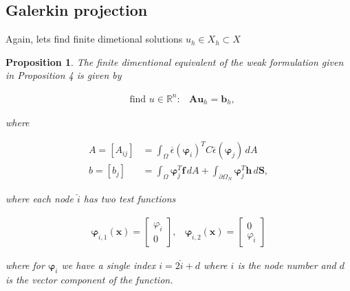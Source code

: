 \documentclass[11pt,a4paper,english]{elsarticle}%
\newtheorem{proposition}[theorem]{Proposition}
\begin{document}
\subsection{Galerkin projection}
Again, lets find finite dimetional solutions $u_h \in X_h \subset X$
\begin{proposition}
    The finite dimentional equivalent of the weak formulation given in Proposition 4 is given by


        \begin{align}
        &\text{find } u \in \mathbb{R}^n : 
        &\bm A \bm u_h = \bm b_h,
        \end{align}


    where 


        \begin{align}
        A = [A_{ij}] &= \int_\Omega \overline\epsilon (\bm \varphi_i)^T C \overline \epsilon (\bm \varphi_j) \, dA \\
        b = [b_j] &= \int_\Omega \bm \varphi_j^T \bm f \, dA + \int_{\partial \Omega_N} \bm \varphi_j^T \bm h \, d\bm S,
        \end{align}


    where each node $\hat i$ has two test functions
    
 
        \begin{align}
        \bm \varphi_{\hat i,1} (\bm x) = 
         \begin{bmatrix}
            \varphi_{\hat i}  \\
            0 
        \end{bmatrix},
        &
        \bm \varphi_{\hat i,2} (\bm x) = 
        \begin{bmatrix}
            0  \\
            \varphi_{\hat i} 
        \end{bmatrix} 
    \end{align}

    where for $\bm \varphi_i$ we have a single index $i = 2\hat i + d$ where $i$ is the node number and $d$ is the vector component of the function.
\end{proposition}
\end{document}
